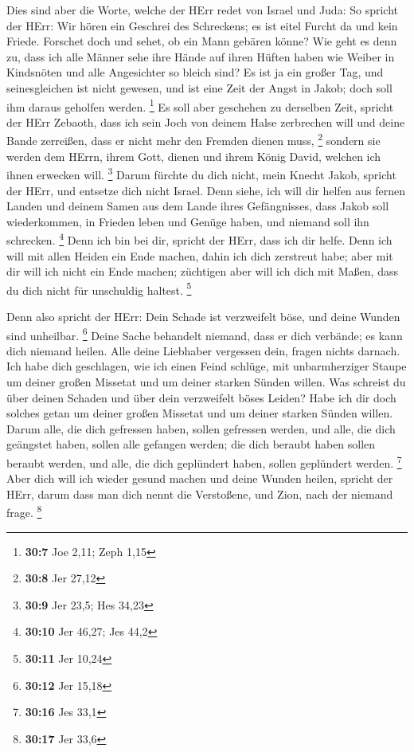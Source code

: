  Dies sind aber die Worte, welche der HErr redet von Israel
und Juda:  So spricht der HErr: Wir hören ein Geschrei des
Schreckens; es ist eitel Furcht da und kein Friede. 
Forschet doch und sehet, ob ein Mann gebären könne? Wie geht es denn zu,
dass ich alle Männer sehe ihre Hände auf ihren Hüften haben wie Weiber
in Kindsnöten und alle Angesichter so bleich sind?  Es ist
ja ein großer Tag, und seinesgleichen ist nicht gewesen, und ist eine
Zeit der Angst in Jakob; doch soll ihm daraus geholfen werden.
\footnote{\textbf{30:7} Joe 2,11; Zeph 1,15}  Es soll aber
geschehen zu derselben Zeit, spricht der HErr Zebaoth, dass ich sein
Joch von deinem Halse zerbrechen will und deine Bande zerreißen, dass er
nicht mehr den Fremden dienen muss, \footnote{\textbf{30:8} Jer 27,12}
 sondern sie werden dem HErrn, ihrem Gott, dienen und ihrem
König David, welchen ich ihnen erwecken will. \footnote{\textbf{30:9}
  Jer 23,5; Hes 34,23}  Darum fürchte du dich nicht, mein
Knecht Jakob, spricht der HErr, und entsetze dich nicht Israel. Denn
siehe, ich will dir helfen aus fernen Landen und deinem Samen aus dem
Lande ihres Gefängnisses, dass Jakob soll wiederkommen, in Frieden leben
und Genüge haben, und niemand soll ihn schrecken. \footnote{\textbf{30:10}
  Jer 46,27; Jes 44,2}  Denn ich bin bei dir, spricht der
HErr, dass ich dir helfe. Denn ich will mit allen Heiden ein Ende
machen, dahin ich dich zerstreut habe; aber mit dir will ich nicht ein
Ende machen; züchtigen aber will ich dich mit Maßen, dass du dich nicht
für unschuldig haltest. \footnote{\textbf{30:11} Jer 10,24}

 Denn also spricht der HErr: Dein Schade ist verzweifelt
böse, und deine Wunden sind unheilbar. \footnote{\textbf{30:12} Jer
  15,18}  Deine Sache behandelt niemand, dass er dich
verbände; es kann dich niemand heilen.  Alle deine
Liebhaber vergessen dein, fragen nichts darnach. Ich habe dich
geschlagen, wie ich einen Feind schlüge, mit unbarmherziger Staupe um
deiner großen Missetat und um deiner starken Sünden willen.
 Was schreist du über deinen Schaden und über dein
verzweifelt böses Leiden? Habe ich dir doch solches getan um deiner
großen Missetat und um deiner starken Sünden willen.  Darum
alle, die dich gefressen haben, sollen gefressen werden, und alle, die
dich geängstet haben, sollen alle gefangen werden; die dich beraubt
haben sollen beraubt werden, und alle, die dich geplündert haben, sollen
geplündert werden. \footnote{\textbf{30:16} Jes 33,1}  Aber
dich will ich wieder gesund machen und deine Wunden heilen, spricht der
HErr, darum dass man dich nennt die Verstoßene, und Zion, nach der
niemand frage. \footnote{\textbf{30:17} Jer 33,6}

